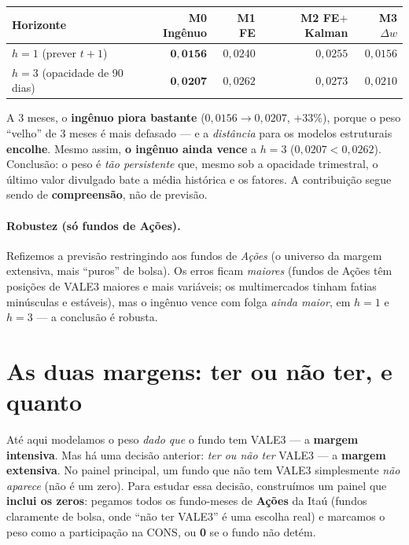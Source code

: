 \documentclass[11pt]{article}
\begin{document}
\begin{table}[h]\centering
\begin{tabular}{@{}lrrrr@{}}
\toprule
Horizonte & M0 Ingênuo & M1 FE & M2 FE$+$Kalman & M3 $\Delta w$ \\
\midrule
$h=1$ (prever $t+1$)            & $\mathbf{0{,}0156}$ & $0{,}0240$ & $0{,}0255$ & $0{,}0156$ \\
$h=3$ (opacidade de 90 dias)    & $\mathbf{0{,}0207}$ & $0{,}0262$ & $0{,}0273$ & $0{,}0210$ \\
\bottomrule
\end{tabular}
\end{table}

\noindent A 3 meses, o \textbf{ingênuo piora bastante} ($0{,}0156\to0{,}0207$, $+33\%$),
porque o peso ``velho'' de 3 meses é mais defasado --- e a \emph{distância} para os
modelos estruturais \textbf{encolhe}. Mesmo assim, \textbf{o ingênuo ainda vence} a
$h=3$ ($0{,}0207<0{,}0262$). Conclusão: o peso é \emph{tão persistente} que, mesmo sob a
opacidade trimestral, o último valor divulgado bate a média histórica e os fatores. A
contribuição segue sendo de \textbf{compreensão}, não de previsão.

\paragraph{Robustez (só fundos de Ações).} Refizemos a previsão restringindo aos fundos
de \emph{Ações} (o universo da margem extensiva, mais ``puros'' de bolsa). Os erros ficam
\emph{maiores} (fundos de Ações têm posições de VALE3 maiores e mais variáveis; os
multimercados tinham fatias minúsculas e estáveis), mas o ingênuo vence com folga
\emph{ainda maior}, em $h=1$ e $h=3$ --- a conclusão é robusta.

\section{As duas margens: ter ou não ter, e quanto}

Até aqui modelamos o peso \emph{dado que} o fundo tem VALE3 --- a \textbf{margem
intensiva}. Mas há uma decisão anterior: \emph{ter ou não ter} VALE3 --- a
\textbf{margem extensiva}. No painel principal, um fundo que não tem VALE3 simplesmente
\emph{não aparece} (não é um zero). Para estudar essa decisão, construímos um painel que
\textbf{inclui os zeros}: pegamos todos os fundo-meses de \textbf{Ações} da Itaú (fundos
claramente de bolsa, onde ``não ter VALE3'' é uma escolha real) e marcamos o peso como a
participação na CONS, ou \textbf{0} se o fundo não detém.
\end{document}
